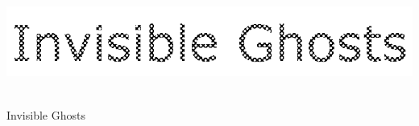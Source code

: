 \documentclass[knowledge.tex]{subfiles}
\begin{document}
    \begin{titlepage}
    
    \newcommand{\HRule}{\rule{\linewidth}{0.5mm}}
    \center 
     
    \includegraphics[width=.7\textwidth]{inv.png}\\[4cm]
    \Huge
    
    { \huge \bfseries \TrainingName}\\

    {\Large Invisible Ghosts}
    
    \vfill 
    \end{titlepage}
\end{document}
